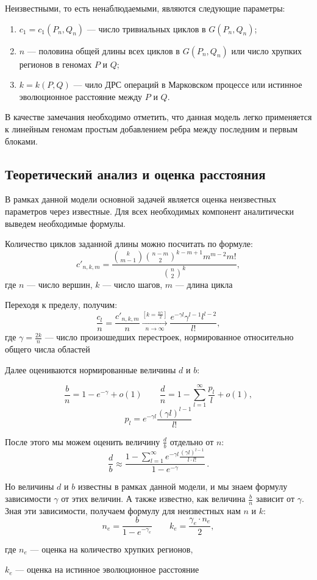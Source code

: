 Неизвестными, то есть ненаблюдаемыми, являются следующие параметры:
\begin{enumerate}
    \item $c_1 = c_1 (P_n , Q_n)$ --- число тривиальных циклов в $G(P_n , Q_n)$;
    \item $n$ --- половина общей длины всех циклов в $G(P_n , Q_n)$ или число хрупких регионов в геномах $P$ и $Q$;
    \item $k = k(P, Q)$ --- чило ДРС операций в Марковском процессе или истинное эволюционное расстояние между $P$ и $Q$.
\end{enumerate}

В качестве замечания необходимо отметить, что данная модель легко применяется к линейным геномам простым добавлением ребра между последним и первым блоками.

\subsection{Теоретический анализ и оценка расстояния}
В рамках данной модели основной задачей является оценка неизвестных параметров через известные.
Для всех необходимых компонент аналитически выведем необходимые формулы.

Количество циклов заданной длины можно посчитать по формуле:
$$c'_{n,k,m}=
\frac{\binom{k}{m-1}\binom{n-m}{2}^{k-m+1}m^{m-2}m!}
{\binom{n}{2}^k},$$
где $n$ --- число вершин, $k$ --- число шагов, $m$ --- длина цикла

Переходя к пределу, получим:
$$\frac{c_l} n = \frac {c'_{n,k,m}} n \xrightarrow[n \to \infty]{[k=\frac{n \gamma}{2}]} \frac{e^{-\gamma l} \gamma^{l-1} l^{l-2}} {l!},$$
где $\gamma = \frac {2k} n$ --- число произошедших перестроек, нормированное относительно общего числа областей

Далее оцениваются нормированные величины $d$ и $b$:

$$\frac b n = 1 - e ^ {- \gamma} + o(1)
\qquad
\frac d n = 1 - \sum_{l=1}^{\infty} \frac {p_l} l + o(1),$$
$$p_l = e^{-\gamma l} \frac {(\gamma l)^{l-1}}{l!}$$

После этого мы можем оценить величину $\frac d b$ отдельно от $n$:
$$\frac d b \approx  \frac {1 - \sum_{l=1}^{\infty} e^{-\gamma l} \frac {(\gamma l)^{l-1}}{l \cdot l!}}{1 - e ^ {- \gamma}} \, .$$

Но величины $d$ и $b$ известны в рамках данной модели, и мы знаем формулу зависимости $\gamma$ от этих величин.
А также известно, как величина $\frac b n$ зависит от $\gamma$.
Зная эти зависимости, получаем формулу для неизвестных нам $n$ и $k$:
$$n_e = \frac b {1 - e^{-\gamma_e}}
\qquad
k_e = \frac {\gamma_e \cdot n_e} {2},$$
\centerline{где $n_e$ --- оценка на количество хрупких регионов,}
\centerline{$k_e$ --- оценка на истинное эволюционное расстояние}

